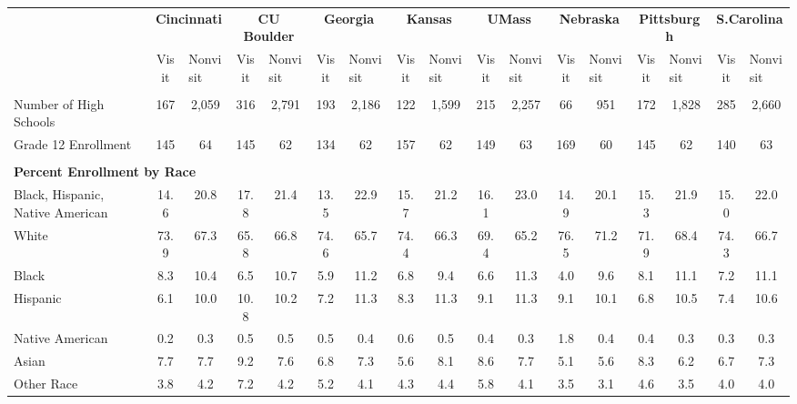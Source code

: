 \begin{tabular*}{\linewidth}{@{\extracolsep{\fill} } lcccccccccccccccc}%
&\multicolumn{2}{c}{\bfseries Cincinnati}&\multicolumn{2}{c}{\bfseries CU Boulder}&\multicolumn{2}{c}{\bfseries Georgia}&\multicolumn{2}{c}{\bfseries Kansas}&\multicolumn{2}{c}{\bfseries UMass}&\multicolumn{2}{c}{\bfseries Nebraska}&\multicolumn{2}{c}{\bfseries Pittsburgh}&\multicolumn{2}{c}{\bfseries S.Carolina}\\%
&Visit&\multicolumn{1}{l}{Nonvisit}&Visit&\multicolumn{1}{l}{Nonvisit}&Visit&\multicolumn{1}{l}{Nonvisit}&Visit&\multicolumn{1}{l}{Nonvisit}&Visit&\multicolumn{1}{l}{Nonvisit}&Visit&\multicolumn{1}{l}{Nonvisit}&Visit&\multicolumn{1}{l}{Nonvisit}&Visit&\multicolumn{1}{l}{Nonvisit}\\%
\hline%
&&&&&&&&&&&&&&&&\\%
\hspace{0cm}Number of High Schools&167&2,059&316&2,791&193&2,186&122&1,599&215&2,257&66&951&172&1,828&285&2,660\\%
\hspace{0cm}Grade 12 Enrollment&145&64&145&62&134&62&157&62&149&63&169&60&145&62&140&63\\%
&&&&&&&&&&&&&&&&\\%
\multicolumn{17}{l}{\bfseries Percent Enrollment by Race}\\%
\hspace{0.2cm}Black, Hispanic, Native American&14.6&20.8&17.8&21.4&13.5&22.9&15.7&21.2&16.1&23.0&14.9&20.1&15.3&21.9&15.0&22.0\\%
\hspace{0.2cm}White&73.9&67.3&65.8&66.8&74.6&65.7&74.4&66.3&69.4&65.2&76.5&71.2&71.9&68.4&74.3&66.7\\%
\hspace{0.2cm}Black&8.3&10.4&6.5&10.7&5.9&11.2&6.8&9.4&6.6&11.3&4.0&9.6&8.1&11.1&7.2&11.1\\%
\hspace{0.2cm}Hispanic&6.1&10.0&10.8&10.2&7.2&11.3&8.3&11.3&9.1&11.3&9.1&10.1&6.8&10.5&7.4&10.6\\%
\hspace{0.2cm}Native American&0.2&0.3&0.5&0.5&0.5&0.4&0.6&0.5&0.4&0.3&1.8&0.4&0.4&0.3&0.3&0.3\\%
\hspace{0.2cm}Asian&7.7&7.7&9.2&7.6&6.8&7.3&5.6&8.1&8.6&7.7&5.1&5.6&8.3&6.2&6.7&7.3\\%
\hspace{0.2cm}Other Race&3.8&4.2&7.2&4.2&5.2&4.1&4.3&4.4&5.8&4.1&3.5&3.1&4.6&3.5&4.0&4.0\\%

\end{tabular*}
